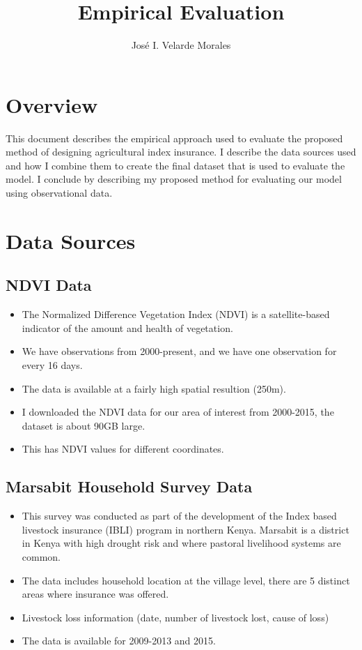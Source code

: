 \documentclass[11pt]{article}
\title{Empirical Evaluation}
\author{José I. Velarde Morales}
\begin{document}
\maketitle 

\section{Overview}
This document describes the empirical approach used to evaluate the proposed method of designing agricultural index insurance. I describe the data sources used and how I combine them to create the final dataset that is used to evaluate the model. I conclude by describing my proposed method for evaluating our model using observational data. 

\section{Data Sources}
  \subsection{NDVI Data}
    \begin{itemize}
        \item The Normalized Difference Vegetation Index (NDVI) is a satellite-based indicator of the amount and health of vegetation. 
        \item We have observations from 2000-present, and we have one observation for every 16 days. 
        \item The data is available at a fairly high spatial resultion (250m).
        \item I downloaded the NDVI data for our area of interest from 2000-2015, the dataset is about 90GB large.
        \item This has NDVI values for different coordinates.
    \end{itemize}

  \subsection{Marsabit Household Survey Data}
    \begin{itemize}
        \item This survey was conducted as part of the development of the Index based livestock insurance (IBLI) program in northern Kenya. Marsabit is a district in Kenya with high drought risk and where pastoral livelihood systems are common. 
        \item The data includes household location at the village level, there are 5 distinct areas where insurance was offered.
        \item Livestock loss information (date, number of livestock lost, cause of loss)
        \item The data is available for 2009-2013 and 2015. 
    \end{itemize}
\end{document}
